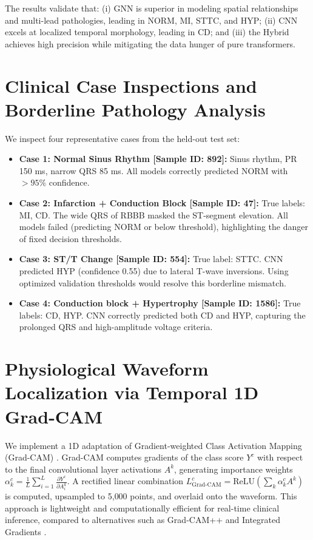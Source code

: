 \documentclass[14pt]{extarticle}
\begin{document}
The results validate that: (i) GNN is superior in modeling spatial relationships and multi-lead pathologies, leading in NORM, MI, STTC, and HYP; (ii) CNN excels at localized temporal morphology, leading in CD; and (iii) the Hybrid achieves high precision while mitigating the data hunger of pure transformers.

\section{Clinical Case Inspections and Borderline Pathology Analysis}
\label{sec:casestudies}
We inspect four representative cases from the held-out test set:
\begin{itemize}
    \item \textbf{Case 1: Normal Sinus Rhythm [Sample ID: 892]:} Sinus rhythm, PR 150 ms, narrow QRS 85 ms. All models correctly predicted NORM with $>95\%$ confidence.
    \item \textbf{Case 2: Infarction + Conduction Block [Sample ID: 47]:} True labels: MI, CD. The wide QRS of RBBB masked the ST-segment elevation. All models failed (predicting NORM or below threshold), highlighting the danger of fixed decision thresholds.
    \item \textbf{Case 3: ST/T Change [Sample ID: 554]:} True label: STTC. CNN predicted HYP (confidence 0.55) due to lateral T-wave inversions. Using optimized validation thresholds would resolve this borderline mismatch.
    \item \textbf{Case 4: Conduction block + Hypertrophy [Sample ID: 1586]:} True labels: CD, HYP. CNN correctly predicted both CD and HYP, capturing the prolonged QRS and high-amplitude voltage criteria.
\end{itemize}

\label{sec:interpretability}
\section{Physiological Waveform Localization via Temporal 1D Grad-CAM}
\label{sec:interpretability}
We implement a 1D adaptation of Gradient-weighted Class Activation Mapping (Grad-CAM) \cite{selvaraju2017grad}. Grad-CAM computes gradients of the class score $Y^c$ with respect to the final convolutional layer activations $A^k$, generating importance weights $\alpha_k^c = \frac{1}{L}\sum_{i=1}^L \frac{\partial Y^c}{\partial A_i^k}$. A rectified linear combination $L_{\text{Grad-CAM}}^c = \text{ReLU}(\sum_k \alpha_k^c A^k)$ is computed, upsampled to 5{,}000 points, and overlaid onto the waveform. This approach is lightweight and computationally efficient for real-time clinical inference, compared to alternatives such as Grad-CAM++ \cite{chattopadhay2018grad} and Integrated Gradients \cite{sundararajan2017axiomatic}.
\end{document}
